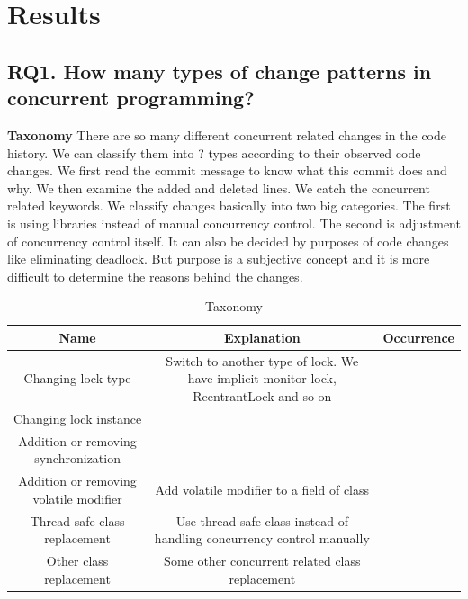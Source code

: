 \documentclass[conference]{IEEEtran}
\begin{document}
\section{Results}

\subsection{RQ1. How many types of change patterns in concurrent programming?}

\textbf{Taxonomy} There are so many different concurrent related changes in the code history. We can classify them into ? types according to their observed code changes. We first read the commit message to know what this commit does and why. We then examine the added and deleted lines. We catch the concurrent related keywords. We classify changes basically into two big categories. The first is using libraries instead of manual concurrency control. The second is adjustment of concurrency control itself. It can also be decided by purposes of code changes like eliminating deadlock. But purpose is a subjective concept and it is more difficult to determine the reasons behind the changes.


\begin{table}
	\centering
	\caption{Taxonomy}
	\begin{tabular}{|c|c|c|}\hline
		Name&Explanation&Occurrence\\\hline
		Changing lock type&Switch to another type of lock. We have implicit monitor lock, ReentrantLock and so on&\\\hline
		Changing lock instance&&\\\hline
		Addition or removing synchronization&&\\\hline
		Addition or removing volatile modifier&Add volatile modifier to a field of class&\\\hline
		Thread-safe class replacement&Use thread-safe class instead of handling concurrency control manually&\\\hline
		Other class replacement&Some other concurrent related class replacement&\\\hline
	\end{tabular}
\end{table}
\end{document}
